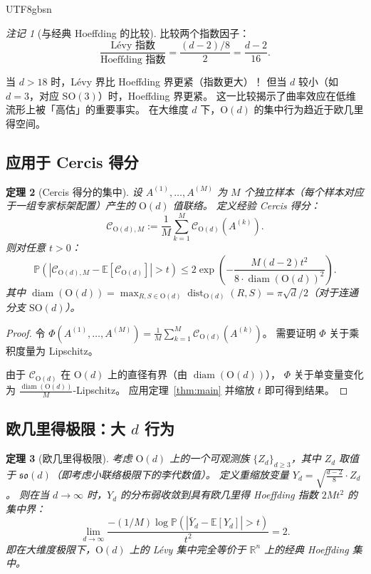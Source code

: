 \documentclass[12pt,a4paper]{article}
\theoremstyle{plain}
\newtheorem{theorem}{定理}[section]
\theoremstyle{definition}
\theoremstyle{remark}
\newtheorem{remark}[theorem]{注记}
\newcommand{\R}{\mathbb{R}}
\newcommand{\E}{\mathbb{E}}
\newcommand{\Pbb}{\mathbb{P}}
\newcommand{\Od}{\mathrm{O}(d)}
\newcommand{\SO}{\mathrm{SO}}
\newcommand{\sod}{\mathfrak{so}(d)}
\newcommand{\cercis}{\mathcal{C}}
\DeclareMathOperator{\dist}{dist}
\DeclareMathOperator{\diam}{diam}
\begin{document}
\begin{CJK}{UTF8}{gbsn}
\begin{remark}[与经典 Hoeffding 的比较]
比较两个指数因子：
\begin{equation}
    \frac{\text{Lévy 指数}}{\text{Hoeffding 指数}} = \frac{(d-2)/8}{2} = \frac{d-2}{16}.
\end{equation}

当 $d > 18$ 时，Lévy 界比 Hoeffding 界更紧（指数更大）！
但当 $d$ 较小（如 $d=3$，对应 $\SO(3)$）时，Hoeffding 界更紧。
这一比较揭示了曲率效应在低维流形上被「高估」的重要事实。
在大维度 $d$ 下，$\Od$ 的集中行为趋近于欧几里得空间。
\end{remark}

\subsection{应用于 Cercis 得分}

\begin{theorem}[Cercis 得分的集中]\label{thm:cercis_conc}
设 $A^{(1)}, \ldots, A^{(M)}$ 为 $M$ 个独立样本（每个样本对应于一组专家标架配置）产生的 $\Od$ 值联络。
定义经验 Cercis 得分：
\begin{equation}
    \cercis_{\Od,M} := \frac{1}{M}\sum_{k=1}^{M} \cercis_{\Od}(A^{(k)}).
\end{equation}
则对任意 $t > 0$：
\begin{equation}\label{eq:cercis_conc_bound}
    \Pbb(|\cercis_{\Od,M} - \E[\cercis_{\Od}]| > t) \leq 2\exp\!\left(-\frac{M(d-2)t^2}{8 \cdot \diam(\Od)^2}\right).
\end{equation}
其中 $\diam(\Od) = \max_{R,S \in \Od} \dist_{\Od}(R, S) = \pi\sqrt{d}/2$（对于连通分支 $\SO(d)$）。
\end{theorem}

\begin{proof}
令 $\Phi(A^{(1)}, \ldots, A^{(M)}) = \frac{1}{M}\sum_{k=1}^M \cercis_{\Od}(A^{(k)})$。
需要证明 $\Phi$ 关于乘积度量为 Lipschitz。

由于 $\cercis_{\Od}$ 在 $\Od$ 上的直径有界（由 $\diam(\Od)$），
$\Phi$ 关于单变量变化为 $\frac{\diam(\Od)}{M}$-Lipschitz。
应用定理~\ref{thm:main} 并缩放 $t$ 即可得到结果。
\end{proof}

\subsection{欧几里得极限：大 $d$ 行为}

\begin{theorem}[欧几里得极限]\label{thm:euclidean_limit}
考虑 $\Od$ 上的一个可观测族 $\{Z_d\}_{d \geq 3}$，其中 $Z_d$ 取值于 $\sod$（即考虑小联络极限下的李代数值）。
定义重缩放变量 $Y_d = \sqrt{\frac{d-2}{8}} \cdot Z_d$。
则在当 $d \to \infty$ 时，$Y_d$ 的分布弱收敛到具有欧几里得 Hoeffding 指数 $2M t^2$ 的集中界：
\begin{equation}
    \lim_{d \to \infty} \frac{-(1/M)\log \Pbb(|\bar{Y}_d - \E[Y_d]| > t)}{t^2} = 2.
\end{equation}
即在大维度极限下，$\Od$ 上的 Lévy 集中完全等价于 $\R^n$ 上的经典 Hoeffding 集中。
\end{theorem}


\end{CJK}
\end{document}
